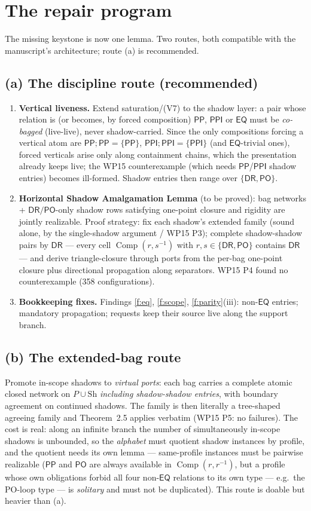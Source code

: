 \documentclass[11pt]{article}
\theoremstyle{definition}
\newcommand{\EQ}{\mathsf{EQ}}
\newcommand{\PP}{\mathsf{PP}}
\newcommand{\PPI}{\mathsf{PPI}}
\newcommand{\PO}{\mathsf{PO}}
\newcommand{\DR}{\mathsf{DR}}
\newcommand{\Comp}{\operatorname{Comp}}
\begin{document}
\section{The repair program}\label{sec:repair}

The missing keystone is now one lemma.  Two routes, both compatible with
the manuscript's architecture; route (a) is recommended.

\subsection*{(a) The discipline route (recommended)}
\begin{enumerate}[label=(R\arabic*),leftmargin=2.6em]
\item \textbf{Vertical liveness.}  Extend saturation/(V7) to the shadow
layer: a pair whose relation is (or becomes, by forced composition)
$\PP$, $\PPI$ or $\EQ$ must be \emph{co-bagged} (live-live), never
shadow-carried.  Since the only compositions forcing a vertical atom are
$\PP;\PP=\{\PP\}$, $\PPI;\PPI=\{\PPI\}$ (and $\EQ$-trivial ones), forced
verticals arise only along containment chains, which the presentation
already keeps live; the WP15 counterexample (which needs $\PP$/$\PPI$
shadow entries) becomes ill-formed.  Shadow entries then range over
$\{\DR,\PO\}$.
\item \textbf{Horizontal Shadow Amalgamation Lemma} (to be proved): bag
networks + $\DR/\PO$-only shadow rows satisfying one-point closure and
rigidity are jointly realizable.  Proof strategy: fix each shadow's
extended family (sound alone, by the single-shadow argument / WP15 P3);
complete shadow-shadow pairs by $\DR$ --- every cell
$\Comp(r,s^{-1})$ with $r,s\in\{\DR,\PO\}$ contains $\DR$ --- and derive
triangle-closure through ports from the per-bag one-point closure plus
directional propagation along separators.  WP15 P4 found no counterexample
(358 configurations).
\item \textbf{Bookkeeping fixes.}  Findings \ref{f:eq}, \ref{f:scope},
\ref{f:parity}(iii): non-$\EQ$ entries; mandatory propagation; requests
keep their source live along the support branch.
\end{enumerate}

\subsection*{(b) The extended-bag route}
Promote in-scope shadows to \emph{virtual ports}: each bag carries a
complete atomic closed network on $P\cup\mathrm{Sh}$ \emph{including
shadow-shadow entries}, with boundary agreement on continued shadows.  The
family is then literally a tree-shaped agreeing family and Theorem~2.5
applies verbatim (WP15 P5: no failures).  The cost is real: along an
infinite branch the number of simultaneously in-scope shadows is unbounded,
so the \emph{alphabet} must quotient shadow instances by profile, and the
quotient needs its own lemma --- same-profile instances must be pairwise
realizable ($\PP$ and $\PO$ are always available in
$\Comp(r,r^{-1})$, but a profile whose own obligations forbid all four
non-$\EQ$ relations to its own type --- e.g.\ the PO-loop type --- is
\emph{solitary} and must not be duplicated).  This route is doable but
heavier than (a).
\end{document}
